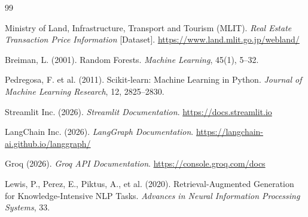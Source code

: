 \documentclass[12pt,a4paper]{article}
\begin{document}
\begin{thebibliography}{99}

Ministry of Land, Infrastructure, Transport and Tourism (MLIT).
\textit{Real Estate Transaction Price Information} [Dataset].
\url{https://www.land.mlit.go.jp/webland/}

Breiman, L. (2001).
Random Forests.
\textit{Machine Learning}, 45(1), 5--32.

Pedregosa, F. et al. (2011).
Scikit-learn: Machine Learning in Python.
\textit{Journal of Machine Learning Research}, 12, 2825--2830.

Streamlit Inc. (2026).
\textit{Streamlit Documentation}.
\url{https://docs.streamlit.io}

LangChain Inc. (2026).
\textit{LangGraph Documentation}.
\url{https://langchain-ai.github.io/langgraph/}

Groq (2026).
\textit{Groq API Documentation}.
\url{https://console.groq.com/docs}

Lewis, P., Perez, E., Piktus, A., et al. (2020).
Retrieval-Augmented Generation for Knowledge-Intensive NLP Tasks.
\textit{Advances in Neural Information Processing Systems}, 33.

\end{thebibliography}
\end{document}
